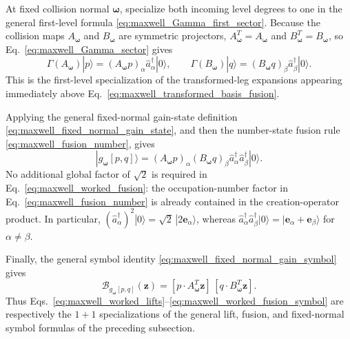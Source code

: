 \documentclass[11pt,oneside]{article}
\numberwithin{equation}{section}
\theoremstyle{definition}
\begin{document}
At fixed collision normal $\bm\omega$, specialize both incoming level degrees to one in the general first-level formula
\eqref{eq:maxwell_Gamma_first_sector}.  Because the collision maps
$A_{\bm\omega}$ and $B_{\bm\omega}$ are symmetric projectors,
$A_{\bm\omega}^T=A_{\bm\omega}$ and
$B_{\bm\omega}^T=B_{\bm\omega}$, so Eq.~\eqref{eq:maxwell_Gamma_sector}
gives
\begin{equation}
\Gamma(A_{\bm\omega})|p\rangle
=
(A_{\bm\omega}p)_\alpha
\hat a_\alpha^\dagger|0\rangle,
\qquad
\Gamma(B_{\bm\omega})|q\rangle
=
(B_{\bm\omega}q)_\beta
\hat a_\beta^\dagger|0\rangle .
\label{eq:maxwell_worked_lifts}
\end{equation}
This is the first-level specialization of the transformed-leg expansions
appearing immediately above Eq.~\eqref{eq:maxwell_transformed_basis_fusion}.

Applying the general fixed-normal gain-state definition
\eqref{eq:maxwell_fixed_normal_gain_state}, and then the number-state fusion
rule \eqref{eq:maxwell_fusion_number}, gives
\begin{equation}
|g_{\bm\omega}[p,q]\rangle
=
(A_{\bm\omega}p)_\alpha
(B_{\bm\omega}q)_\beta
\hat a_\alpha^\dagger\hat a_\beta^\dagger|0\rangle .
\label{eq:maxwell_worked_fusion}
\end{equation}
No additional global factor of $\sqrt2$ is required in
Eq.~\eqref{eq:maxwell_worked_fusion}: the occupation-number factor in
Eq.~\eqref{eq:maxwell_fusion_number} is already contained in the
creation-operator product.  In particular,
$(\hat a_\alpha^\dagger)^2|0\rangle=\sqrt2\,|2\bm e_\alpha\rangle$,
whereas
$\hat a_\alpha^\dagger\hat a_\beta^\dagger|0\rangle
=|\bm e_\alpha+\bm e_\beta\rangle$ for $\alpha\neq\beta$.

Finally, the general symbol identity
\eqref{eq:maxwell_fixed_normal_gain_symbol} gives
\begin{equation}
\mathscr B_{g_{\bm\omega}[p,q]}(\bm z)
=
[p\cdot A_{\bm\omega}^T\bm z]\,
[q\cdot B_{\bm\omega}^T\bm z].
\label{eq:maxwell_worked_fusion_symbol}
\end{equation}
Thus Eqs.~\eqref{eq:maxwell_worked_lifts}--\eqref{eq:maxwell_worked_fusion_symbol}
are respectively the $1+1$ specializations of the general lift, fusion, and
fixed-normal symbol formulas of the preceding subsection.
\end{document}
